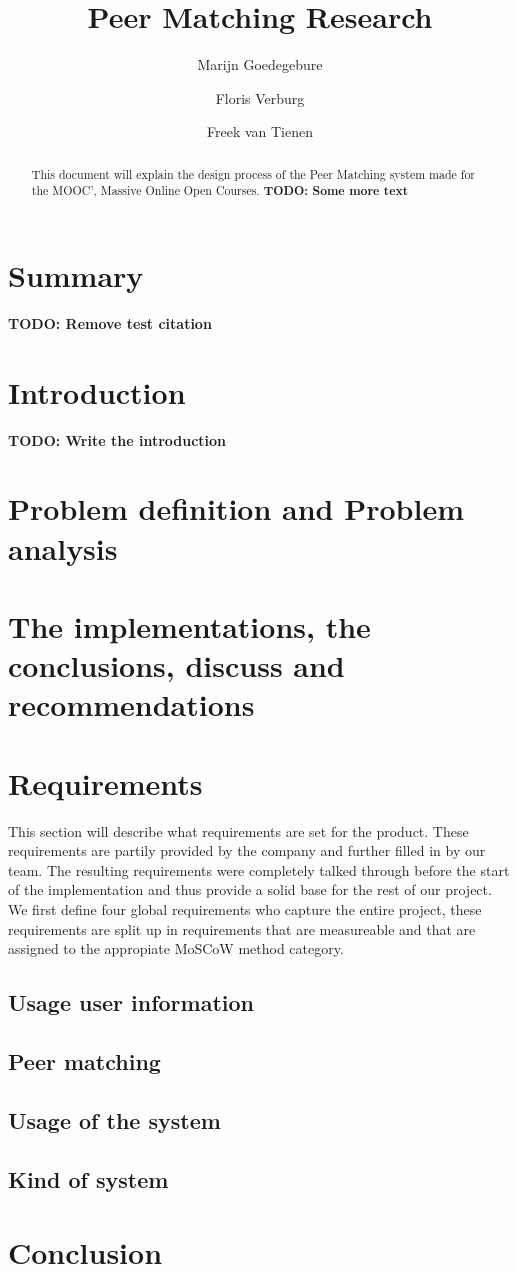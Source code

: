 \documentclass[]{article}
\title{Peer Matching Research}
\author{Marijn Goedegebure \and
	Floris Verburg \and
	Freek van Tienen}
\date{}
\newcommand{\TODO}[1]{{\color{red}\textbf{TODO: #1}}}
\begin{document}
\maketitle

\begin{abstract}
This document will explain the design process of the Peer Matching system made for the MOOC', Massive Online Open Courses.
\TODO{Some more text}
\end{abstract}

\tableofcontents

\section{Summary}
\TODO{Remove test citation\cite{policella07}}

\section{Introduction}
\TODO{Write the introduction}

\section{Problem definition and Problem analysis}

\section{The implementations,	the conclusions, discuss and recommendations}

\section{Requirements}
This section will describe what requirements are set for the product.
These requirements are partily provided by the company and further filled in by our team.
The resulting requirements were completely talked through before the start of the implementation and thus provide a solid base for the rest of our project.
We first define four global requirements who capture the entire project, these requirements are split up in requirements that are measureable and that are assigned to the appropiate MoSCoW method category.

\subsection{Usage user information}

\subsection{Peer matching}

\subsection{Usage of the system}

\subsection{Kind of system}

\section{Conclusion}

\newpage


\end{document}
